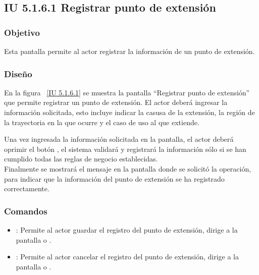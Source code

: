 \newpage 
\subsection{IU 5.1.6.1 Registrar punto de extensión}

\subsubsection{Objetivo}
	
	Esta pantalla permite al actor registrar la información de un punto de extensión.

\subsubsection{Diseño}

    En la figura ~\ref{IU 5.1.6.1} se muestra la pantalla ``Registrar punto de extensión'' que permite registrar un punto de extensión. El actor deberá ingresar la información solicitada, esto incluye indicar la casusa de la extensión, la región de la trayectoria en la que ocurre y el caso de uso al que extiende.
    
    Una vez ingresada la información solicitada en la pantalla, el actor deberá oprimir el botón 
    , el sistema validará y registrará la información sólo si se han cumplido todas las reglas de negocio establecidas.  \\
    
    Finalmente se mostrará el mensaje  en la pantalla donde se solicitó la operación, para indicar que la información del punto de extensión se ha registrado correctamente.        




\subsubsection{Comandos}
\begin{itemize}
	\item {}: Permite al actor guardar el registro del punto de extensión, dirige a la pantalla  o .
	\item {}: Permite al actor cancelar el registro del punto de extensión, dirige a la pantalla  o .
\end{itemize}

